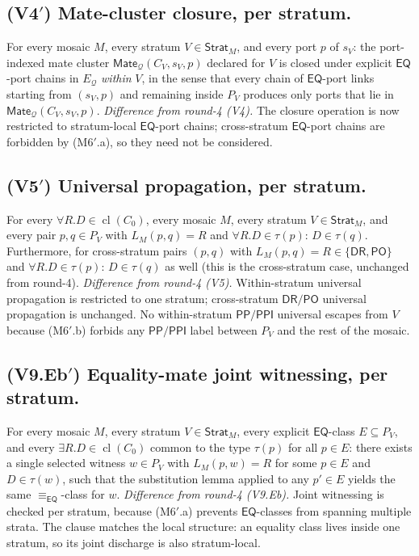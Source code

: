 \documentclass[11pt]{article}
\theoremstyle{definition}
\theoremstyle{remark}
\newcommand{\DR}{\mathsf{DR}}
\newcommand{\PO}{\mathsf{PO}}
\newcommand{\PP}{\mathsf{PP}}
\newcommand{\PPI}{\mathsf{PPI}}
\newcommand{\EQ}{\mathsf{EQ}}
\newcommand{\Mate}{\mathsf{Mate}}
\newcommand{\Q}{\mathcal{Q}}
\newcommand{\Cl}{\operatorname{cl}}
\newcommand{\Stratum}{\mathsf{Strat}}
\newcommand{\eqc}{\equiv_{\EQ}}
\begin{document}
\subsection*{(V4$'$) Mate-cluster closure, per stratum.}
For every mosaic $M$, every stratum $V\in\Stratum_M$, and every port
$p$ of $s_V$: the port-indexed mate cluster $\Mate_\Q(C_V,s_V,p)$
declared for $V$ is closed under explicit $\EQ$-port chains in $E_\Q$
\emph{within} $V$, in the sense that every chain of $\EQ$-port links
starting from $(s_V,p)$ and remaining inside $P_V$ produces only
ports that lie in $\Mate_\Q(C_V,s_V,p)$.
\smallskip\noindent
\emph{Difference from round-4 (V4).} The closure operation is now
restricted to stratum-local $\EQ$-port chains; cross-stratum
$\EQ$-port chains are forbidden by (M6$'$.a), so they need not be
considered.

\subsection*{(V5$'$) Universal propagation, per stratum.}
For every $\forall R.D\in\Cl(C_0)$, every mosaic $M$, every stratum
$V\in\Stratum_M$, and every pair $p,q\in P_V$ with $L_M(p,q)=R$ and
$\forall R.D\in\tau(p)$: $D\in\tau(q)$.  Furthermore, for
cross-stratum pairs $(p,q)$ with $L_M(p,q)=R\in\{\DR,\PO\}$ and
$\forall R.D\in\tau(p)$: $D\in\tau(q)$ as well (this is the
cross-stratum case, unchanged from round-4).
\smallskip\noindent
\emph{Difference from round-4 (V5).} Within-stratum universal
propagation is restricted to one stratum; cross-stratum $\DR/\PO$
universal propagation is unchanged.  No within-stratum $\PP/\PPI$
universal escapes from $V$ because (M6$'$.b) forbids any $\PP/\PPI$
label between $P_V$ and the rest of the mosaic.

\subsection*{(V9.Eb$'$) Equality-mate joint witnessing, per stratum.}
For every mosaic $M$, every stratum $V\in\Stratum_M$, every explicit
$\EQ$-class $E\subseteq P_V$, and every $\exists R.D\in\Cl(C_0)$
common to the type $\tau(p)$ for all $p\in E$: there exists a single
selected witness $w\in P_V$ with $L_M(p,w)=R$ for some $p\in E$ and
$D\in\tau(w)$, such that the substitution lemma applied to any
$p'\in E$ yields the same $\eqc$-class for $w$.
\smallskip\noindent
\emph{Difference from round-4 (V9.Eb).} Joint witnessing is checked
per stratum, because (M6$'$.a) prevents $\EQ$-classes from spanning
multiple strata.  The clause matches the local structure: an
equality class lives inside one stratum, so its joint discharge is
also stratum-local.
\end{document}
